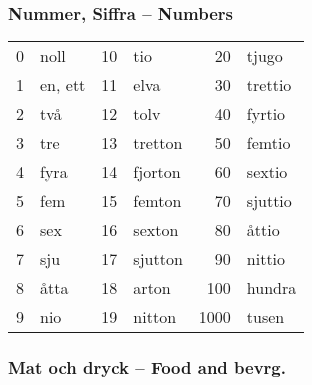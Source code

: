 \documentclass[14pt]{refcard} %
\begin{document}
\subsubsection{Nummer, Siffra -- Numbers}
\vspace{-1ex}
\begin{tabular}{rl rl rl}
0 & noll    &  10 & tio              &   20 & tjugo            \\
1 & en, ett &  11 & elva             &   30 & trettio          \\
2 & två     &  12 & tolv             &   40 & fyrtio           \\
3 & tre     &  13 & tretton          &   50 & femtio           \\
4 & fyra    &  14 & fjorton          &   60 & sextio           \\
5 & fem     &  15 & femton           &   70 & sjuttio          \\
6 & sex     &  16 & sexton           &   80 & åttio            \\
7 & sju     &  17 & sjutton          &   90 & nittio           \\
8 & åtta    &  18 & arton            &  100 & hundra           \\
9 & nio     &  19 & nitton           & 1000 & tusen            \\
\end{tabular}


\pagebreak

\subsubsection{Mat och dryck -- Food and bevrg.}
\end{document}
